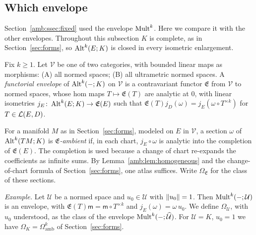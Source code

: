 \subsection{Which envelope}\label{amb:ssec:envelope}

Section~\ref{amb:ssec:fixed} used the envelope $\operatorname{Mult}^k$. Here we compare it with the other envelopes. Throughout this subsection $K$ is complete, as in Section~\ref{sec:forms}, so $\operatorname{Alt}^k(E;K)$ is closed in every isometric enlargement.

\begin{definition}\label{amb:def:envelope}
Fix $k\ge1$. Let $\mathcal V$ be one of two categories, with bounded linear maps as morphisms: (A) all normed spaces; (B) all ultrametric normed spaces. A \emph{functorial envelope} of $\operatorname{Alt}^k(-;K)$ on $\mathcal V$ is a contravariant functor $\mathfrak E$ from $\mathcal V$ to normed spaces, whose hom maps $T\mapsto\mathfrak E(T)$ are analytic at $0$, with linear isometries $j_E\colon\operatorname{Alt}^k(E;K)\to\mathfrak E(E)$ such that $\mathfrak E(T)j_D(\omega)=j_E(\omega\circ T^{\times k})$ for $T\in\mathcal L(E,D)$.

For a manifold $M$ as in Section~\ref{sec:forms}, modeled on $E$ in $\mathcal V$, a section $\omega$ of $\operatorname{Alt}^k(TM;K)$ is \emph{$\mathfrak E$-ambient} if, in each chart, $j_E\circ\omega$ is analytic into the completion of $\mathfrak E(E)$. The completion is used because a change of chart re-expands the coefficients as infinite sums. By Lemma~\ref{amb:lem:homogeneous} and the change-of-chart formula of Section~\ref{sec:forms}, one atlas suffices. Write $\Omega_{\mathfrak E}$ for the class of these sections.

\emph{Example.} Let $\mathcal U$ be a normed space and $u_0\in\mathcal U$ with $\lVert u_0\rVert=1$. Then $\operatorname{Mult}^k(-;\mathcal U)$ is an envelope, with $\mathfrak E(T)\mathsf m=\mathsf m\circ T^{\times k}$ and $j_E(\omega)=\omega\,u_0$. We define $\Omega_{\mathcal U}$, with $u_0$ understood, as the class of the envelope $\operatorname{Mult}^k(-;\widehat{\mathcal U})$. For $\mathcal U=K$, $u_0=1$ we have $\Omega_K=\Omega^k_{\mathrm{amb}}$ of Section~\ref{sec:forms}.


\end{definition}
